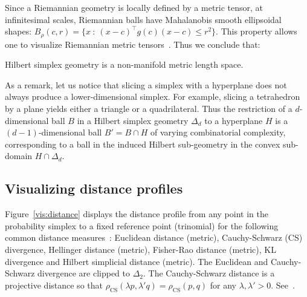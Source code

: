 \documentclass[graybox]{svmult}
\def\CS{\mathrm{CS}}
\begin{document}
Since a Riemannian geometry is locally defined by a metric tensor, at infinitesimal scales, Riemannian balls have Mahalanobis smooth ellipsoidal shapes:
$B_\rho(c,r)=\{x\ :\ (x-c)^\top g(c) (x-c)\leq r^2\}$.
This property allows one to visualize Riemannian metric tensors~\cite{VizTensor-2009}. Thus we conclude that:
\begin{lemma}[\cite{BH-2014}]
Hilbert simplex geometry is a non-manifold metric length space.
\end{lemma}

As a remark, let us notice that slicing a simplex with a hyperplane does not always produce a lower-dimensional simplex.
For example, slicing a tetrahedron by a plane yields either a triangle or a quadrilateral.
Thus the restriction of a $d$-dimensional ball $B$ in a Hilbert simplex geometry $\Delta_d$ to a hyperplane $H$ is a $(d-1)$-dimensional ball $B'=B\cap H$  of varying combinatorial complexity, corresponding to a ball in the induced Hilbert sub-geometry in the convex sub-domain $H\cap\Delta_d$.


\subsection{Visualizing distance profiles}

Figure~\ref{vis:distance} displays the distance profile from any point in the probability simplex 
to a fixed reference point (trinomial) for the following common distance measures~\cite{IG-2014}:
Euclidean distance (metric), Cauchy-Schwarz (CS) divergence,
Hellinger distance (metric), Fisher-Rao distance (metric),
KL divergence and Hilbert simplicial distance (metric).
The Euclidean and Cauchy-Schwarz divergence are clipped to $\Delta_2$. 
The Cauchy-Schwarz distance is a projective distance so that $\rho_\CS(\lambda p,\lambda' q)=\rho_\CS(p,q)$ for any $\lambda,\lambda'>0$.
See~\cite{holder}.
\end{document}
